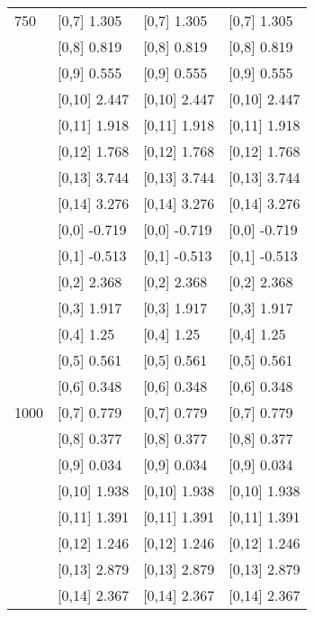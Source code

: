 \begin{table}
\begin{tabular}[t]{llll}
750 & {}[0,7] 1.305 & {}[0,7] 1.305 & {}[0,7] 1.305\\
 & {}[0,8] 0.819 & {}[0,8] 0.819 & {}[0,8] 0.819\\
 & {}[0,9] 0.555 & {}[0,9] 0.555 & {}[0,9] 0.555\\
\addlinespace
 & {}[0,10] 2.447 & {}[0,10] 2.447 & {}[0,10] 2.447\\
 & {}[0,11] 1.918 & {}[0,11] 1.918 & {}[0,11] 1.918\\
 & {}[0,12] 1.768 & {}[0,12] 1.768 & {}[0,12] 1.768\\
 & {}[0,13] 3.744 & {}[0,13] 3.744 & {}[0,13] 3.744\\
 & {}[0,14] 3.276 & {}[0,14] 3.276 & {}[0,14] 3.276\\
\addlinespace
 & {}[0,0] -0.719 & {}[0,0] -0.719 & {}[0,0] -0.719\\
 & {}[0,1] -0.513 & {}[0,1] -0.513 & {}[0,1] -0.513\\
 & {}[0,2] 2.368 & {}[0,2] 2.368 & {}[0,2] 2.368\\
 & {}[0,3] 1.917 & {}[0,3] 1.917 & {}[0,3] 1.917\\
 & {}[0,4] 1.25 & {}[0,4] 1.25 & {}[0,4] 1.25\\
\addlinespace
 & {}[0,5] 0.561 & {}[0,5] 0.561 & {}[0,5] 0.561\\
 & {}[0,6] 0.348 & {}[0,6] 0.348 & {}[0,6] 0.348\\
1000 & {}[0,7] 0.779 & {}[0,7] 0.779 & {}[0,7] 0.779\\
 & {}[0,8] 0.377 & {}[0,8] 0.377 & {}[0,8] 0.377\\
 & {}[0,9] 0.034 & {}[0,9] 0.034 & {}[0,9] 0.034\\
\addlinespace
 & {}[0,10] 1.938 & {}[0,10] 1.938 & {}[0,10] 1.938\\
 & {}[0,11] 1.391 & {}[0,11] 1.391 & {}[0,11] 1.391\\
 & {}[0,12] 1.246 & {}[0,12] 1.246 & {}[0,12] 1.246\\
 & {}[0,13] 2.879 & {}[0,13] 2.879 & {}[0,13] 2.879\\
 & {}[0,14] 2.367 & {}[0,14] 2.367 & {}[0,14] 2.367\\
\bottomrule
\end{tabular}
\end{table}
